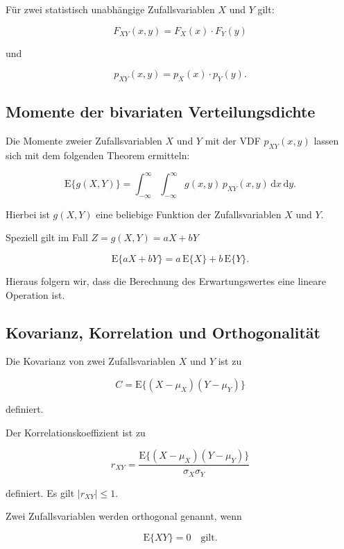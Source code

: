 \begin{definition}
Für zwei statistisch unabhängige Zufallsvariablen $X$ und $Y$ gilt:

$$
F_{XY}(x,y) = F_X(x) \cdot F_Y(y)
$$

und

$$
p_{XY}(x,y) = p_X(x) \cdot p_Y(y).
$$
\end{definition}

\subsection{Momente der bivariaten Verteilungsdichte}
\label{sec:bivariate-momente}

\begin{satz}
Die Momente zweier Zufallsvariablen $X$ und $Y$ mit der VDF $p_{XY}(x,y)$ lassen sich mit dem folgenden Theorem ermitteln:

$$
\mathrm{E}\{g(X,Y)\} = \int_{-\infty}^{\infty} \int_{-\infty}^{\infty} g(x,y)\,p_{XY}(x,y)\,\mathrm{d}x\,\mathrm{d}y.
$$

Hierbei ist $g(X,Y)$ eine beliebige Funktion der Zufallsvariablen $X$ und $Y$.

Speziell gilt im Fall $Z = g(X,Y) = aX + bY$

$$
\mathrm{E}\{aX + bY\} = a\,\mathrm{E}\{X\} + b\,\mathrm{E}\{Y\}.
$$
\end{satz}

Hieraus folgern wir, dass die Berechnung des Erwartungswertes eine lineare Operation ist.

\subsection{Kovarianz, Korrelation und Orthogonalität}
\label{sec:kovarianz-korrelation}

\begin{definition}
Die Kovarianz von zwei Zufallsvariablen $X$ und $Y$ ist zu

$$
C = \mathrm{E}\{(X - \mu_X)(Y - \mu_Y)\}
$$

definiert.

Der Korrelationskoeffizient ist zu

$$
r_{XY} = \frac{\mathrm{E}\{(X - \mu_X)(Y - \mu_Y)\}}{\sigma_X \sigma_Y}
$$

definiert. Es gilt $|r_{XY}| \leq 1$.

Zwei Zufallsvariablen werden orthogonal genannt, wenn

$$
\mathrm{E}\{XY\} = 0 \quad \text{gilt.}
$$
\end{definition}

